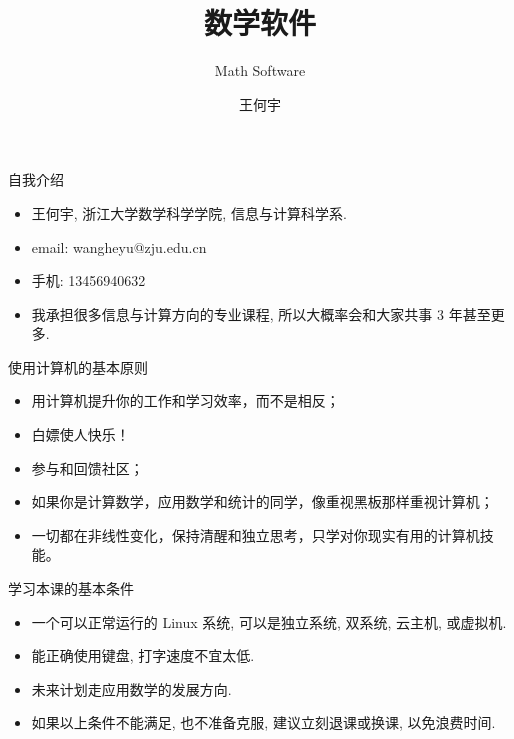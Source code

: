 \documentclass{beamer}
\title[MS2023] %
{\Huge 数学软件}
\subtitle
{Math Software} %
\author[Wang HY] %
{王何宇}
\institute[Zhejiang University] %
{
  浙江大学数学科学学院\\
  计算数学系
}
\date[Short Occasion] %
{}
\begin{document}
\begin{frame}
 \titlepage
\end{frame}

\begin{frame}{自我介绍}
  \begin{itemize}
  \item 王何宇, 浙江大学数学科学学院, 信息与计算科学系.
  \item email: wangheyu@zju.edu.cn
  \item 手机: 13456940632
  \item 我承担很多信息与计算方向的专业课程, 所以大概率会和大家共事 3 年甚至更多.
  \end{itemize}
\end{frame}

\begin{frame}{使用计算机的基本原则}
  \begin{itemize}
  \item<1-> 用计算机提升你的工作和学习效率，而不是相反；
  \item<2-> 白嫖使人快乐！ 
  \item<3-> 参与和回馈社区；
  \item<4-> 如果你是计算数学，应用数学和统计的同学，像重视黑板那样重视计算机；
  \item<5-> 一切都在非线性变化，保持清醒和独立思考，只学对你现实有用的计算机技能。
  \end{itemize}
\end{frame}

\begin{frame}{学习本课的基本条件}
  \begin{itemize}
  \item<1-> 一个可以正常运行的 Linux 系统, 可以是独立系统, 双系统, 云主机, 或虚拟机.
  \item<2-> 能正确使用键盘, 打字速度不宜太低.
  \item<3-> 未来计划走应用数学的发展方向.
  \item<4-> 如果以上条件不能满足, 也不准备克服, 建议立刻退课或换课, 以免浪费时间.
  \end{itemize}
\end{frame}
\end{document}
